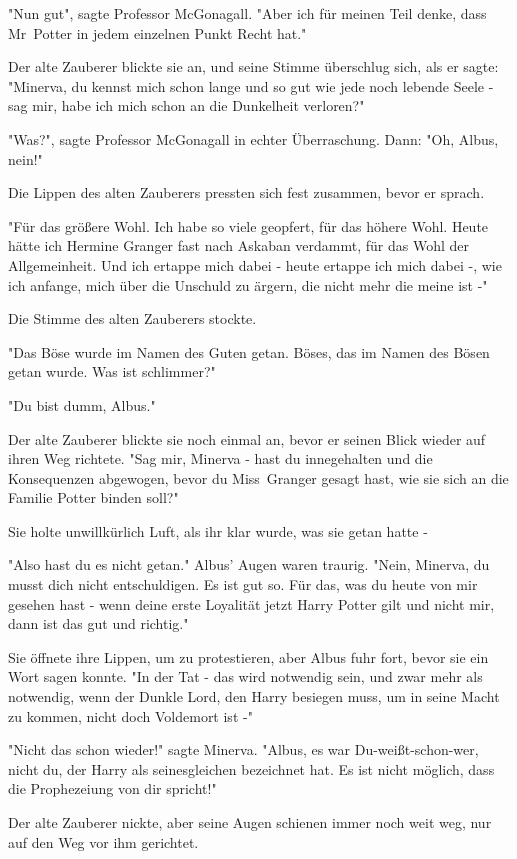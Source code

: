 {"Nun gut", sagte Professor McGonagall. "Aber ich für meinen Teil denke, dass Mr~Potter in jedem einzelnen Punkt Recht hat."

Der alte Zauberer blickte sie an, und seine Stimme überschlug sich, als er sagte: "Minerva, du kennst mich schon lange und so gut wie jede noch lebende Seele - sag mir, habe ich mich schon an die Dunkelheit verloren?"

"Was?", sagte Professor McGonagall in echter Überraschung. Dann: "Oh, Albus, nein!"

Die Lippen des alten Zauberers pressten sich fest zusammen, bevor er sprach.

"Für das größere Wohl. Ich habe so viele geopfert, für das höhere Wohl. Heute hätte ich Hermine Granger fast nach Askaban verdammt, für das Wohl der Allgemeinheit. Und ich ertappe mich dabei - heute ertappe ich mich dabei -, wie ich anfange, mich über die Unschuld zu ärgern, die nicht mehr die meine ist -"

Die Stimme des alten Zauberers stockte.

"Das Böse wurde im Namen des Guten getan. Böses, das im Namen des Bösen getan wurde. Was ist schlimmer?"

"Du bist dumm, Albus."

Der alte Zauberer blickte sie noch einmal an, bevor er seinen Blick wieder auf ihren Weg richtete. "Sag mir, Minerva - hast du innegehalten und die Konsequenzen abgewogen, bevor du Miss~Granger gesagt hast, wie sie sich an die Familie Potter binden soll?"

Sie holte unwillkürlich Luft, als ihr klar wurde, was sie getan hatte -

"Also hast du es nicht getan." Albus' Augen waren traurig. "Nein, Minerva, du musst dich nicht entschuldigen. Es ist gut so. Für das, was du heute von mir gesehen hast - wenn deine erste Loyalität jetzt Harry Potter gilt und nicht mir, dann ist das gut und richtig."

Sie öffnete ihre Lippen, um zu protestieren, aber Albus fuhr fort, bevor sie ein Wort sagen konnte. "In der Tat - das wird notwendig sein, und zwar mehr als notwendig, wenn der Dunkle Lord, den Harry besiegen muss, um in seine Macht zu kommen, nicht doch Voldemort ist -"

"Nicht das schon wieder!" sagte Minerva. "Albus, es war Du-weißt-schon-wer, nicht du, der Harry als seinesgleichen bezeichnet hat. Es ist nicht möglich, dass die Prophezeiung von dir spricht!"

Der alte Zauberer nickte, aber seine Augen schienen immer noch weit weg, nur auf den Weg vor ihm gerichtet.

}
